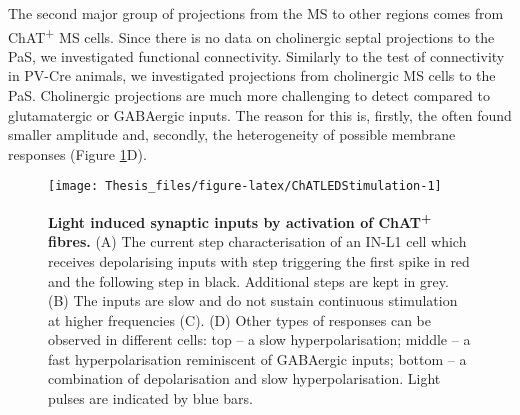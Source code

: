 \documentclass[
  12pt,
  a4paper,
  openany]{book}
\begin{document}
The second major group of projections from the MS to other regions comes from ChAT\textsuperscript{+} MS cells. Since there is no data on cholinergic septal projections to the PaS, we investigated functional connectivity. Similarly to the test of connectivity in PV-Cre animals, we investigated projections from cholinergic MS cells to the PaS. Cholinergic projections are much more challenging to detect compared to glutamatergic or GABAergic inputs. The reason for this is, firstly, the often found smaller amplitude and, secondly, the heterogeneity of possible membrane responses (Figure \ref{fig:ChATLEDStimulation}D).




\begin{figure}[htbp]

{\centering \texttt{[image: Thesis\_files/figure-latex/ChATLEDStimulation-1]} 

}

\caption[Light induced synaptic inputs by activation of ChAT\textsuperscript{+} fibres]{\textbf{Light induced synaptic inputs by activation of ChAT\textsuperscript{+} fibres.} (A) The current step characterisation of an IN-L1 cell which receives depolarising inputs with step triggering the first spike in red and the following step in black. Additional steps are kept in grey. (B) The inputs are slow and do not sustain continuous stimulation at higher frequencies (C). (D) Other types of responses can be observed in different cells: top -- a slow hyperpolarisation; middle -- a fast hyperpolarisation reminiscent of GABAergic inputs; bottom -- a combination of depolarisation and slow hyperpolarisation. Light pulses are indicated by blue bars.}\label{fig:ChATLEDStimulation}
\end{figure}
\end{document}
